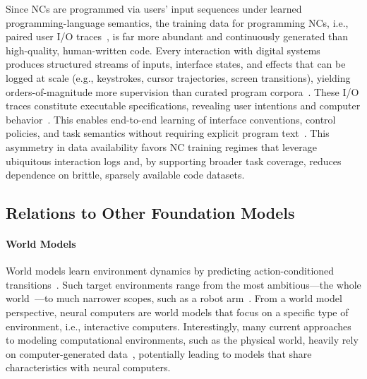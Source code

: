 Since NCs are programmed via users' input sequences under learned programming-language semantics, the training data for programming NCs, i.e., paired user I/O traces~\citep{flener2008introduction}, is far more abundant and continuously generated than high-quality, human-written code.
Every interaction with digital systems produces structured streams of inputs, interface states, and effects that can be logged at scale (e.g., keystrokes, cursor trajectories, screen transitions), yielding orders-of-magnitude more supervision than curated program corpora~\citep{yao2022webshop}. 
These I/O traces constitute executable specifications, revealing user intentions and computer behavior~\citep{cypher1993watch}.
This enables end-to-end learning of interface conventions, control policies, and task semantics without requiring explicit program text~\citep{yao2022react}. This asymmetry in data availability favors NC training regimes that leverage ubiquitous interaction logs and, by supporting broader task coverage, reduces dependence on brittle, sparsely available code datasets.

\subsection{Relations to Other Foundation Models}
\label{sec:relations}
\paragraph{World Models}
World models learn environment dynamics by predicting action-conditioned transitions~\citep{ha2018world}.
Such target environments range from the most ambitious—the whole world~\citep{schmidhuber1990making}—to much narrower scopes, such as a robot arm~\citep{feng2023finetuning}.
From a world model perspective, neural computers are world models that focus on a specific type of environment, i.e., interactive computers.
Interestingly, many current approaches to modeling computational environments, such as the physical world, heavily rely on computer-generated data~\citep{richter2016playing,tobin2017domain,dosovitskiy2017carla,garcia2023robust}, potentially leading to models that share characteristics with neural computers. 

